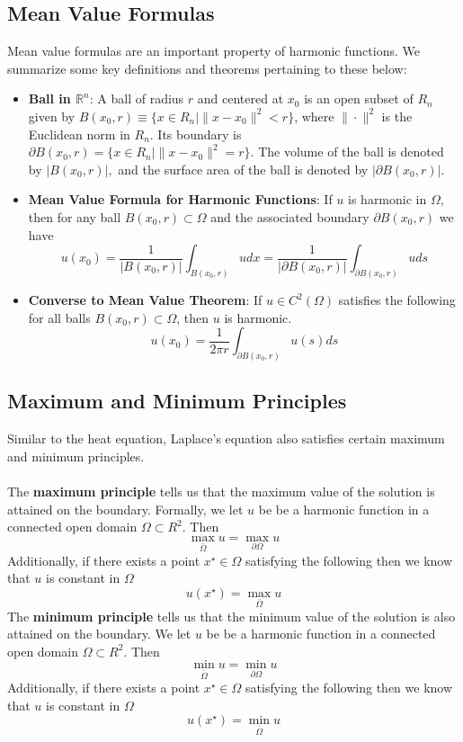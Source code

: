 \documentclass[11pt]{article}
\newcommand{\R}{\mathbb{R}}
\begin{document}
\subsection{Mean Value Formulas}
Mean value formulas are an important property of harmonic functions.  We summarize some key definitions and theorems pertaining to these below:
\begin{itemize}
\item \textbf{Ball in $\R^n$}: A ball of radius $r$ and centered at $x_0$ is an open subset of $R_n$ given by $B(x_0,r) \equiv \{ x \in R_n | \| {x-x_0} \|^2 < r \}$, where $\|\cdot \|^2$ is the Euclidean norm in $R_n$. Its boundary is $\partial B (x_0, r) =  \{x \in R_n | \|x- x_0\|^2 = r \}$. The volume of the ball is denoted by $|B(x_0,r)|,$ and the surface area of the ball is denoted by $| \partial B(x_0,r)|$.
\item \textbf{Mean Value Formula for Harmonic Functions}: If $u$ is harmonic in $\Omega$, then for any ball $B(x_0, r) \subset \Omega$ and the associated boundary $\partial B(x_0,r)$ we have
$$ u(x_0) = \frac{1}{|B(x_0,r)|} \int_{B(x_0,r)} udx = \frac{1}{|\partial B(x_0,r)|} \int_{\partial B(x_0,r)} uds$$
\item \textbf{Converse to Mean Value Theorem}: If $u \in C^2(\Omega)$ satisfies the following for all balls $B(x_0, r) \subset \Omega$, then $u$ is harmonic.
$$ u(x_0) = \frac{1}{2 \pi r} \int_{\partial B(x_0,r)} u(s) ds$$
\end{itemize}

\subsection{Maximum and Minimum Principles}
Similar to the heat equation, Laplace’s equation also satisfies certain maximum and minimum principles. \\ \\ The \textbf{maximum principle} tells us that the maximum value of the solution is attained on the boundary.  Formally, we let $u$ be be a harmonic function in a connected open domain $\Omega \subset R^2$. Then 
$$ \max_{\bar{\Omega}} u =  \max_{\partial \Omega} u $$ Additionally, if there exists a point $x^{\star} \in \Omega$ satisfying the following then we know that $u$ is constant in $\Omega$ $$ u(x^{\star}) = \max_{\bar{\Omega}} u$$  
The \textbf{minimum principle} tells us that the minimum value of the solution is also attained on the boundary.  We let $u$ be be a harmonic function in a connected open domain $\Omega \subset R^2$. Then 
$$ \min_{\bar{\Omega}} u =  \min_{\partial \Omega} u $$ Additionally, if there exists a point $x^{\star} \in \Omega$ satisfying the following then we know that $u$ is constant in $\Omega$ $$ u(x^{\star}) = \min_{\bar{\Omega}} u$$  
\end{document}
